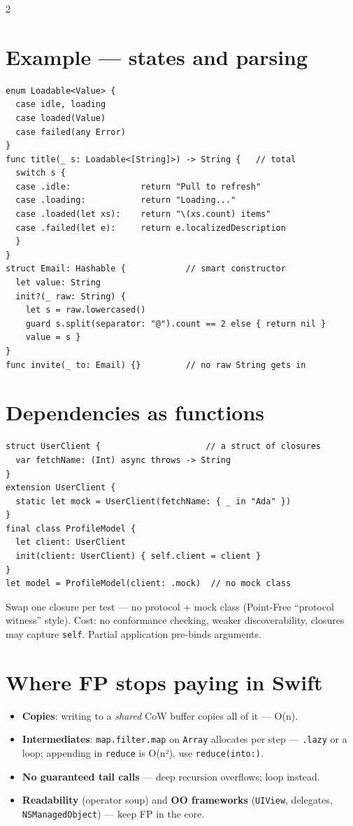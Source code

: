 \documentclass[8pt]{extarticle}
\begin{document}
\begin{multicols}{2}
\section{Example — states and parsing}
\begin{lstlisting}[language=SwiftSheet]
enum Loadable<Value> {
  case idle, loading
  case loaded(Value)
  case failed(any Error)
}
func title(_ s: Loadable<[String]>) -> String {   // total
  switch s {
  case .idle:              return "Pull to refresh"
  case .loading:           return "Loading..."
  case .loaded(let xs):    return "\(xs.count) items"
  case .failed(let e):     return e.localizedDescription
  }
}
struct Email: Hashable {            // smart constructor
  let value: String
  init?(_ raw: String) {
    let s = raw.lowercased()
    guard s.split(separator: "@").count == 2 else { return nil }
    value = s }
}
func invite(_ to: Email) {}         // no raw String gets in
\end{lstlisting}

\columnbreak

\section{Dependencies as functions}
\begin{lstlisting}[language=SwiftSheet]
struct UserClient {                     // a struct of closures
  var fetchName: (Int) async throws -> String
}
extension UserClient {
  static let mock = UserClient(fetchName: { _ in "Ada" })
}
final class ProfileModel {
  let client: UserClient
  init(client: UserClient) { self.client = client }
}
let model = ProfileModel(client: .mock)  // no mock class
\end{lstlisting}
Swap one closure per test — no protocol + mock class (Point-Free ``protocol witness''
style). Cost: no conformance checking, weaker discoverability, closures may capture
\texttt{self}. Partial application pre-binds arguments.

\section{Where FP stops paying in Swift}
\begin{itemize}
  \item \textbf{Copies}: writing to a \emph{shared} CoW buffer copies all of it — O(n).
  \item \textbf{Intermediates}: \texttt{map.filter.map} on \texttt{Array} allocates per step
        — \texttt{.lazy} or a loop; appending in \texttt{reduce} is O(n²), use
        \texttt{reduce(into:)}.
  \item \textbf{No guaranteed tail calls} — deep recursion overflows; loop instead.
  \item \textbf{Readability} (operator soup) and \textbf{OO frameworks} (\texttt{UIView},
        delegates, \texttt{NSManagedObject}) — keep FP in the core.
\end{itemize}


\end{multicols}
\end{document}
